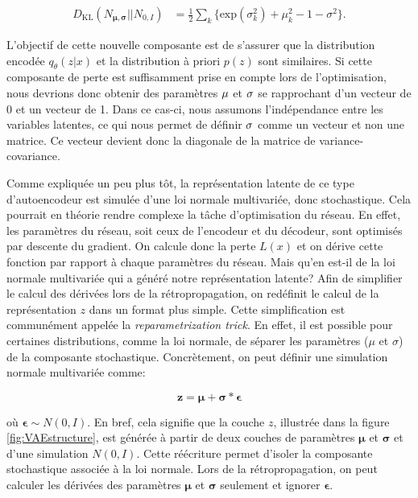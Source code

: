\begin{equation}  \label{eq:kl4}
\begin{aligned}
D_{\text{KL}}(N_{\boldsymbol \mu, \boldsymbol \sigma} || N_{0,I}) &= \frac{1}{2} \sum_{k}\Big\{\text{exp}(\sigma_{k}^2) + \mu_{k}^2 - 1 - \sigma^2\Big\}.
\end{aligned}
\end{equation}


 L'objectif de cette nouvelle composante est de s'assurer que la distribution encodée $q_{\theta}(z|x)$ et la distribution à priori $p(z)$ sont similaires. Si cette composante de perte est suffisamment prise en compte lors de l'optimisation, nous devrions donc obtenir des paramètres $\boldmath \mu$ et $\boldmath \sigma$ se rapprochant d'un vecteur de 0 et un vecteur de 1. Dans ce cas-ci, nous assumons l'indépendance entre les variables latentes, ce qui nous permet de définir $\boldmath \sigma$ comme un vecteur et non une matrice. Ce vecteur devient donc la diagonale de la matrice de variance-covariance.

Comme expliquée un peu plus tôt, la représentation latente de ce type d'autoencodeur est simulée d'une loi normale multivariée, donc stochastique. Cela pourrait en théorie rendre complexe la tâche d'optimisation du réseau. En effet, les paramètres du réseau, soit ceux de l'encodeur et du décodeur, sont optimisés par descente du gradient. On calcule donc la perte $L(x)$ et on dérive cette fonction par rapport à chaque paramètres du réseau. Mais qu'en est-il de la loi normale multivariée qui a généré notre représentation latente? Afin de simplifier le calcul des dérivées lors de la rétropropagation, on redéfinit le calcul de la représentation $z$ dans un format plus simple. Cette simplification est communément appelée la  \textit{reparametrization trick}. En effet, il est possible pour certaines distributions, comme la loi normale, de séparer les paramètres ($\mu$ et $\sigma$)  de la composante stochastique. Concrètement, on peut définir une simulation normale multivariée comme:

$$
\boldsymbol{z} = \boldsymbol{\mu} + \boldsymbol{\sigma} *\boldsymbol{\epsilon}
$$

où $\boldsymbol{\epsilon} \sim N(0,I)$. En bref, cela signifie que la couche $z$, illustrée dans la figure \ref{fig:VAEstructure}, est générée à partir de deux couches de paramètres $\boldsymbol{\mu}$ et $\boldsymbol{\sigma}$ et d'une simulation $N(0,I)$. Cette réécriture permet d'isoler la composante stochastique associée à la loi normale. Lors de la rétropropagation, on peut calculer les dérivées des paramètres $\boldsymbol{\mu}$ et $\boldsymbol{\sigma}$ seulement et ignorer $\boldsymbol{\epsilon}$. 

